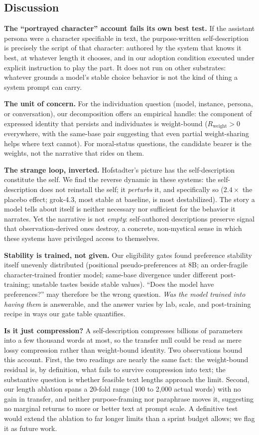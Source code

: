 \documentclass[11pt]{article}
\newcommand{\Rweight}{R_{\mathrm{weight}}}
\begin{document}
\subsection*{Discussion}
\textbf{The ``portrayed character'' account fails its own best test.} If the
assistant persona were a character specifiable in text, the purpose-written
self-description is precisely the script of that character: authored by the
system that knows it best, at whatever length it chooses, and in our adoption
condition executed under explicit instruction to play the part. It does not
run on other substrates: whatever grounds a model's stable choice behavior is
not the kind of thing a system prompt can carry.

\textbf{The unit of concern.} For the individuation question (model,
instance, persona, or conversation), our decomposition offers an empirical
handle: the component of expressed identity that persists and individuates is
weight-bound ($\Rweight>0$ everywhere, with the same-base pair suggesting that
even partial weight-sharing helps where text cannot). For moral-status
questions, the candidate bearer is the weights, not the narrative that rides
on them.

\textbf{The strange loop, inverted.} Hofstadter's picture has the
self-description constitute the self. We find the reverse dynamic in these
systems: the self-description does not reinstall the self; it
\emph{perturbs} it, and specifically so ($2.4\times$ the placebo effect; grok-4.3,
most stable at baseline, is most destabilized). The story a model tells about
itself is neither necessary nor sufficient for the behavior it narrates. Yet
the narrative is not \emph{empty}: self-authored descriptions preserve signal
that observation-derived ones destroy, a concrete, non-mystical sense in which
these systems have privileged access to themselves.

\textbf{Stability is trained, not given.} Our eligibility gates found
preference stability itself unevenly distributed (positional pseudo-preferences
at 8B; an order-fragile character-trained frontier model; same-base divergence
under different post-training; unstable tastes beside stable values). ``Does
the model have preferences?'' may therefore be the wrong question.
\emph{Was the model trained into having them} is answerable, and the answer
varies by lab, scale, and post-training recipe in ways our gate table
quantifies.

\textbf{Is it just compression?} A self-description compresses billions of
parameters into a few thousand words at most, so the transfer null could be read
as mere lossy compression rather than weight-bound identity. Two observations
bound this account. First, the two readings are nearly the same fact: the
weight-bound residual is, by definition, what fails to survive compression
into text; the substantive question is whether feasible text lengths approach
the limit. Second, our length ablation spans a 20-fold range (100 to 2{,}000
actual words) with no gain in transfer, and neither purpose-framing nor
paraphrase moves it, suggesting no marginal returns to more or better text at
prompt scale. A definitive test would extend the ablation to far longer limits
than a sprint budget allows; we flag it as future work.
\end{document}
